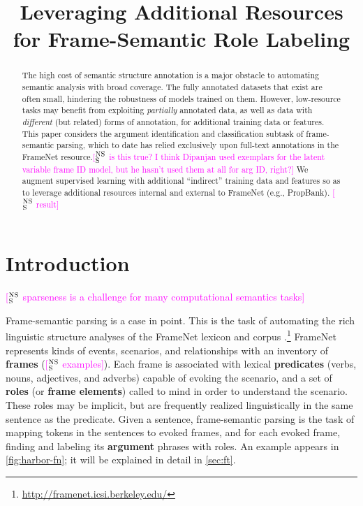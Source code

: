 \documentclass[11pt,a4paper]{article}
\title{\nss{provisional title:}Leveraging Additional Resources for Frame-Semantic Role Labeling}
\date{}
\newcommand{\ensuretext}[1]{#1}
\newcommand{\nssmarker}{\ensuretext{\textcolor{magenta}{\ensuremath{^{\textsc{NS}}_{\textsc{S}}}}}}
\newcommand{\arkcomment}[3]{\ensuretext{\textcolor{#3}{[#1 #2]}}}
\newcommand{\nss}[1]{\arkcomment{\nssmarker}{#1}{magenta}}
\begin{document}
\maketitle
\begin{abstract}
The high cost of semantic structure annotation is a major obstacle 
to automating semantic analysis with broad coverage.
The fully annotated datasets that exist are often small, 
hindering the robustness of models trained on them.
However, low-resource tasks may benefit from exploiting \emph{partially} annotated data, 
as well as data with \emph{different} (but related) forms of annotation,
for additional training data or features.
This paper considers the argument identification and classification subtask 
of frame-semantic parsing, which to date has relied exclusively 
upon full-text annotations in the FrameNet resource.\nss{is this true? I think Dipanjan used exemplars for the latent variable frame ID model, but he hasn't used them at all for arg ID, right?}
We augment supervised learning with additional 
``indirect'' training data and features 
so as to leverage additional resources internal and external to FrameNet (e.g., PropBank). 
\nss{result}
\end{abstract}

\section{Introduction}

\nss{sparseness is a challenge for many computational semantics tasks}

Frame-semantic parsing \citep{das-14} is a case in point.
This is the task of automating the rich linguistic structure analyses 
of the FrameNet lexicon and corpus \citep{baker-98}.\footnote{\url{http://framenet.icsi.berkeley.edu/}}
FrameNet represents kinds of events, scenarios, and relationships 
with an inventory of \textbf{frames} (\nss{examples}). 
Each frame is associated with lexical \textbf{predicates} (verbs, nouns, adjectives, and adverbs) capable of 
evoking the scenario, and a set of \textbf{roles} (or \textbf{frame elements}) 
called to mind in order to understand the scenario. 
These roles may be implicit, 
but are frequently realized linguistically in the same sentence as the predicate.
Given a sentence, frame-semantic parsing is the task of mapping tokens in the sentences
to evoked frames, and for each evoked frame, finding and labeling its \textbf{argument} phrases 
with roles. 
An example appears in \cref{fig:harbor-fn}; it will be explained in detail in \cref{sec:ft}.
\end{document}
